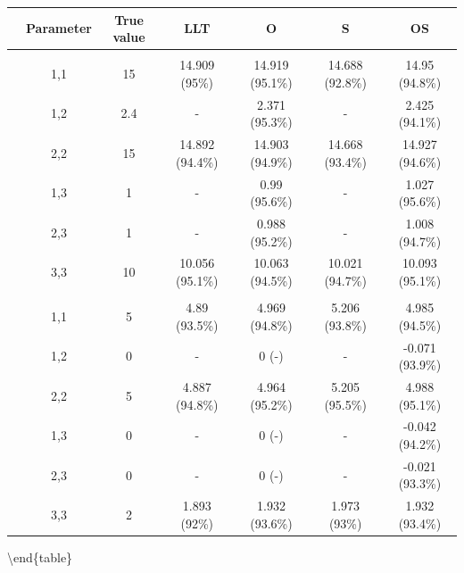 \documentclass[
]{article}
\begin{document}
\begin{tabular}[t]{ccccccc}
\toprule
 & Parameter & True value & LLT & O & S & OS\\
\midrule
\addlinespace[0.3em]
\multicolumn{7}{l}{\textbf{Observation Error}}\\
\hspace{1em} & 1,1 & 15 & 14.909 (95\%) & 14.919 (95.1\%) & 14.688 (92.8\%) & 14.95 (94.8\%)\\
\cmidrule{2-7}
\hspace{1em} & 1,2 & 2.4 & - & 2.371 (95.3\%) & - & 2.425 (94.1\%)\\
\cmidrule{2-7}
\hspace{1em} & 2,2 & 15 & 14.892 (94.4\%) & 14.903 (94.9\%) & 14.668 (93.4\%) & 14.927 (94.6\%)\\
\cmidrule{2-7}
\hspace{1em} & 1,3 & 1 & - & 0.99 (95.6\%) & - & 1.027 (95.6\%)\\
\cmidrule{2-7}
\hspace{1em} & 2,3 & 1 & - & 0.988 (95.2\%) & - & 1.008 (94.7\%)\\
\cmidrule{2-7}
\hspace{1em} & 3,3 & 10 & 10.056 (95.1\%) & 10.063 (94.5\%) & 10.021 (94.7\%) & 10.093 (95.1\%)\\
\cmidrule{1-7}
\addlinespace[0.3em]
\multicolumn{7}{l}{\textbf{State Process}}\\
\hspace{1em} & 1,1 & 5 & 4.89 (93.5\%) & 4.969 (94.8\%) & 5.206 (93.8\%) & 4.985 (94.5\%)\\
\cmidrule{2-7}
\hspace{1em} & 1,2 & 0 & - & 0 (-) & - & -0.071 (93.9\%)\\
\cmidrule{2-7}
\hspace{1em} & 2,2 & 5 & 4.887 (94.8\%) & 4.964 (95.2\%) & 5.205 (95.5\%) & 4.988 (95.1\%)\\
\cmidrule{2-7}
\hspace{1em} & 1,3 & 0 & - & 0 (-) & - & -0.042 (94.2\%)\\
\cmidrule{2-7}
\hspace{1em} & 2,3 & 0 & - & 0 (-) & - & -0.021 (93.3\%)\\
\cmidrule{2-7}
\hspace{1em} & 3,3 & 2 & 1.893 (92\%) & 1.932 (93.6\%) & 1.973 (93\%) & 1.932 (93.4\%)\\
\bottomrule
\end{tabular}

\textbackslash end\{table\}
\end{document}
